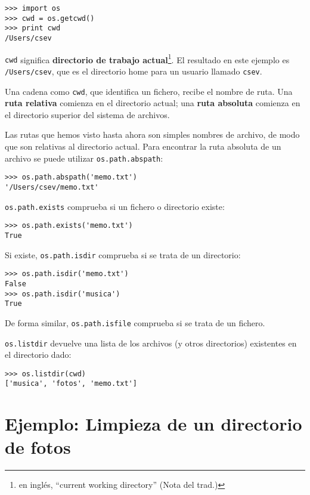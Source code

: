 \beforeverb
\begin{verbatim}
>>> import os
>>> cwd = os.getcwd()
>>> print cwd
/Users/csev
\end{verbatim}
\afterverb
%
{\tt cwd} significa {\bf directorio de trabajo actual}\footnote{en inglés, ``current working
directory'' (Nota del trad.)}. El resultado en
este ejemplo es {\tt /Users/csev}, que es el directorio home para un
usuario llamado {\tt csev}.


Una cadena como {\tt cwd}, que identifica un fichero, recibe el nombre de ruta.
Una {\bf ruta relativa} comienza en el directorio actual;
una {\bf ruta absoluta} comienza en el directorio superior del
sistema de archivos.


Las rutas que hemos visto hasta ahora son simples nombres de archivo, de modo que
son relativas al directorio actual. Para encontrar la ruta absoluta de
un archivo se puede utilizar {\tt os.path.abspath}:

\beforeverb
\begin{verbatim}
>>> os.path.abspath('memo.txt')
'/Users/csev/memo.txt'
\end{verbatim}
\afterverb
%
{\tt os.path.exists} comprueba
si un fichero o directorio existe:


\beforeverb
\begin{verbatim}
>>> os.path.exists('memo.txt')
True
\end{verbatim}
\afterverb
%
Si existe, {\tt os.path.isdir} comprueba si se trata de un directorio:

\beforeverb
\begin{verbatim}
>>> os.path.isdir('memo.txt')
False
>>> os.path.isdir('musica')
True
\end{verbatim}
\afterverb
%
De forma similar, {\tt os.path.isfile} comprueba si se trata de un fichero.

{\tt os.listdir} devuelve una lista de los archivos (y otros directorios)
existentes en el directorio dado:

\beforeverb
\begin{verbatim}
>>> os.listdir(cwd)
['musica', 'fotos', 'memo.txt']
\end{verbatim}
\afterverb
%


\section{Ejemplo: Limpieza de un directorio de fotos}

